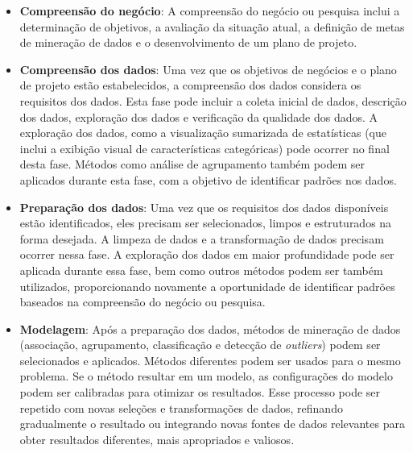 \begin{itemize}
  \item 
\textbf{Compreensão do negócio}: A compreensão do negócio ou pesquisa inclui a determinação de objetivos, a avaliação da situação atual, a definição de metas de mineração de dados e o desenvolvimento de um plano de projeto.
  \item
\textbf{Compreensão dos dados}: Uma vez que os objetivos de negócios e o plano de projeto estão estabelecidos, a compreensão dos dados considera os requisitos dos dados. Esta fase pode incluir a coleta inicial de dados, descrição dos dados, exploração dos dados e verificação da qualidade dos dados. A exploração dos dados, como a visualização sumarizada de estatísticas (que inclui a exibição visual de características categóricas) pode ocorrer no final desta fase. Métodos como análise de agrupamento também podem ser aplicados durante esta fase, com a objetivo de identificar padrões nos dados.
  \item
\textbf{Preparação dos dados}: Uma vez que os requisitos dos dados disponíveis estão identificados, eles precisam ser selecionados, limpos e estruturados na forma desejada. A limpeza de dados e a transformação de dados precisam ocorrer nessa fase. A exploração dos dados em maior profundidade pode ser aplicada durante essa fase, bem como outros métodos podem ser também utilizados, proporcionando novamente a oportunidade de identificar padrões baseados na compreensão do negócio ou pesquisa.
  \item
\textbf{Modelagem}: Após a preparação dos dados, métodos de mineração de dados (associação, agrupamento, classificação e detecção de \textit{outliers}) podem ser selecionados e aplicados. Métodos diferentes podem ser usados para o mesmo problema. Se o método resultar em um modelo, as configurações do modelo podem ser calibradas para otimizar os resultados. Esse processo pode ser repetido com novas seleções e transformações de dados, refinando gradualmente o resultado ou integrando novas fontes de dados relevantes para obter resultados diferentes, mais apropriados e valiosos.


\end{itemize}
